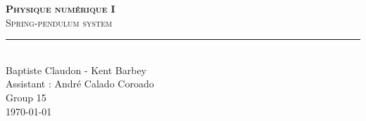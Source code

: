 \documentclass[11pt,titlepage]{article}
\begin{document}
\begin{titlepage}
	\centering
    \textbf{\textsc{\fontsize{50}{50}\selectfont Physique numérique I}}\\ \vspace{\fill}		
	\textsc{\LARGE Spring-pendulum system}\\[0.4cm]
	\rule{\linewidth}{0.2 mm} \\[0.5 cm]
	Baptiste Claudon  -  Kent Barbey\\[0.5cm]Assistant : André Calado Coroado\\[0.5cm]Group 15\\[0.5cm] \today
\end{titlepage}

\thispagestyle{numberonly}



\newpage
\renewcommand\contentsname{\color{black}Table of contents}
\tableofcontents
\vspace{0.5cm}
\begin{invsummary}
\end{invsummary}
\newpage
\listoffigures
\vspace{0.5cm}
\begin{invsummary}
\end{invsummary}
\newpage

\newpage

\newpage

\newpage

\newpage

\newpage

\pagestyle{numberonly}
\printbibliography
\end{document}
